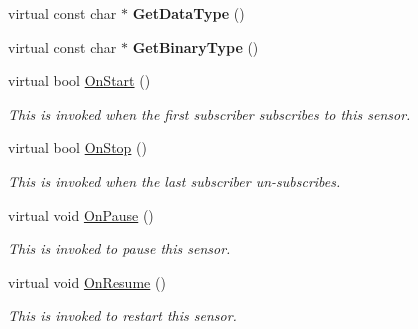 \begin{DoxyCompactItemize}
\mbox{\label{class_telephony_microphone_acedec63000d7213285ddfb4e7474105d}} 
virtual const char $\ast$ {\bfseries Get\+Data\+Type} ()
\item 
\mbox{\label{class_telephony_microphone_a2e43cc400de496224aa00115362ee2b1}} 
virtual const char $\ast$ {\bfseries Get\+Binary\+Type} ()
\item 
\mbox{\label{class_telephony_microphone_af8dd386c022883aab868b232fd6e2676}} 
virtual bool \hyperlink{class_telephony_microphone_af8dd386c022883aab868b232fd6e2676}{On\+Start} ()
\begin{DoxyCompactList}\small\item\em This is invoked when the first subscriber subscribes to this sensor. \end{DoxyCompactList}\item 
\mbox{\label{class_telephony_microphone_a01055ff84f01b086e07e0a91553ca6dd}} 
virtual bool \hyperlink{class_telephony_microphone_a01055ff84f01b086e07e0a91553ca6dd}{On\+Stop} ()
\begin{DoxyCompactList}\small\item\em This is invoked when the last subscriber un-\/subscribes. \end{DoxyCompactList}\item 
\mbox{\label{class_telephony_microphone_aff29d7a9f627a6ebe29eaa6c17dcf032}} 
virtual void \hyperlink{class_telephony_microphone_aff29d7a9f627a6ebe29eaa6c17dcf032}{On\+Pause} ()
\begin{DoxyCompactList}\small\item\em This is invoked to pause this sensor. \end{DoxyCompactList}\item 
\mbox{\label{class_telephony_microphone_a148c411f20af227993a13a2fe8c00008}} 
virtual void \hyperlink{class_telephony_microphone_a148c411f20af227993a13a2fe8c00008}{On\+Resume} ()
\begin{DoxyCompactList}\small\item\em This is invoked to restart this sensor. \end{DoxyCompactList}\end{DoxyCompactItemize}
